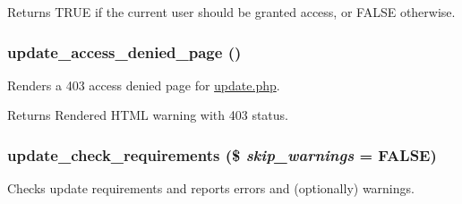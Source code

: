 \begin{DoxyReturn}{Returns}
TRUE if the current user should be granted access, or FALSE otherwise. 
\end{DoxyReturn}
\hypertarget{update_8php_aa43f1c9a3442570821ad190a3dd429db}{
\subsubsection[{update\_\-access\_\-denied\_\-page}]{\setlength{\rightskip}{0pt plus 5cm}update\_\-access\_\-denied\_\-page ()}}
\label{update_8php_aa43f1c9a3442570821ad190a3dd429db}
Renders a 403 access denied page for \hyperlink{update_8php}{update.php}.

\begin{DoxyReturn}{Returns}
Rendered HTML warning with 403 status. 
\end{DoxyReturn}
\hypertarget{update_8php_a2d0a8d0f6385e83fb00d99fb64132d21}{
\subsubsection[{update\_\-check\_\-requirements}]{\setlength{\rightskip}{0pt plus 5cm}update\_\-check\_\-requirements (\$ {\em skip\_\-warnings} = {\ttfamily FALSE})}}
\label{update_8php_a2d0a8d0f6385e83fb00d99fb64132d21}
Checks update requirements and reports errors and (optionally) warnings.


